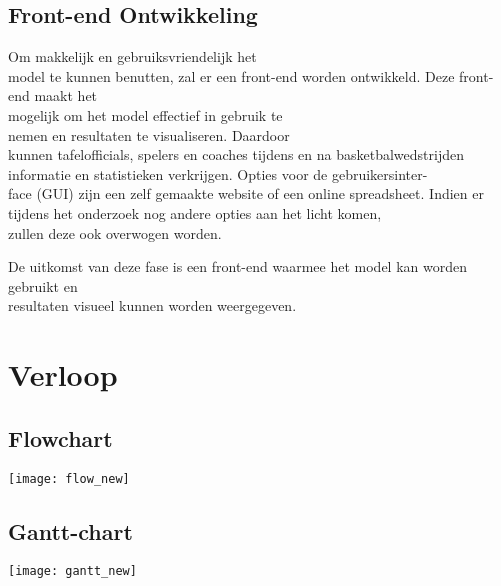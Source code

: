 


\subsection{Front-end Ontwikkeling}
Om makkelijk en gebruiksvriendelijk het \\model te kunnen benutten, zal er een front-end worden ontwikkeld. 
Deze front-end maakt het \\mogelijk om het model effectief in gebruik te \\nemen en resultaten te visualiseren. Daardoor \\kunnen tafelofficials, spelers en coaches tijdens en na basketbalwedstrijden informatie en statistieken verkrijgen. 
Opties voor de gebruikersinter-\\face (GUI) zijn een zelf gemaakte website of een online spreadsheet. Indien er tijdens het onderzoek nog andere opties aan het licht komen, \\zullen deze ook overwogen worden.

De uitkomst van deze fase is een front-end waarmee het model kan worden gebruikt en \\resultaten visueel kunnen worden weergegeven.


\section{Verloop}%
\label{sec:verloop}


\subsection{Flowchart}
\texttt{[image: flow\_new]}
\\

\subsection{Gantt-chart}
\texttt{[image: gantt\_new]}
\\\\

